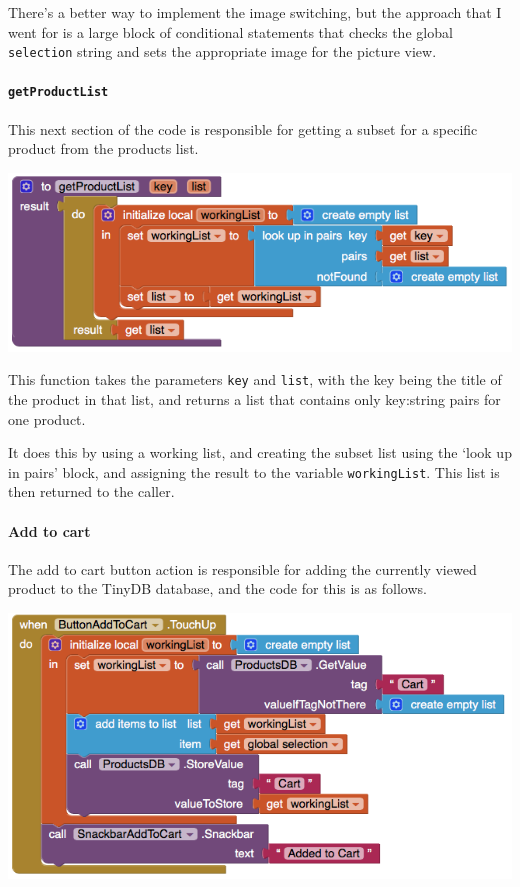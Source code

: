 \documentclass{scrreprt}
\begin{document}
There's a better way to implement the image switching, but the approach that I went for is a large block of conditional statements that checks the global \texttt{selection} string and sets the appropriate image for the picture view.

\paragraph{\texttt{getProductList}}

This next section of the code is responsible for getting a subset for a specific product from the products list.

\begin{center}
    \includegraphics[width=0.9\linewidth]{images/productGetProductList.png}
\end{center}

This function takes the parameters \texttt{key} and \texttt{list}, with the key being the title of the product in that list, and returns a list that contains only key:string pairs for one product.

It does this by using a working list, and creating the subset list using the `look up in pairs' block, and assigning the result to the variable \texttt{workingList}. This list is then returned to the caller.

\paragraph{Add to cart}

The add to cart button action is responsible for adding the currently viewed product to the TinyDB database, and the code for this is as follows.

\begin{center}
    \includegraphics[width=0.9\linewidth]{images/productCart.png}
\end{center}
\end{document}

